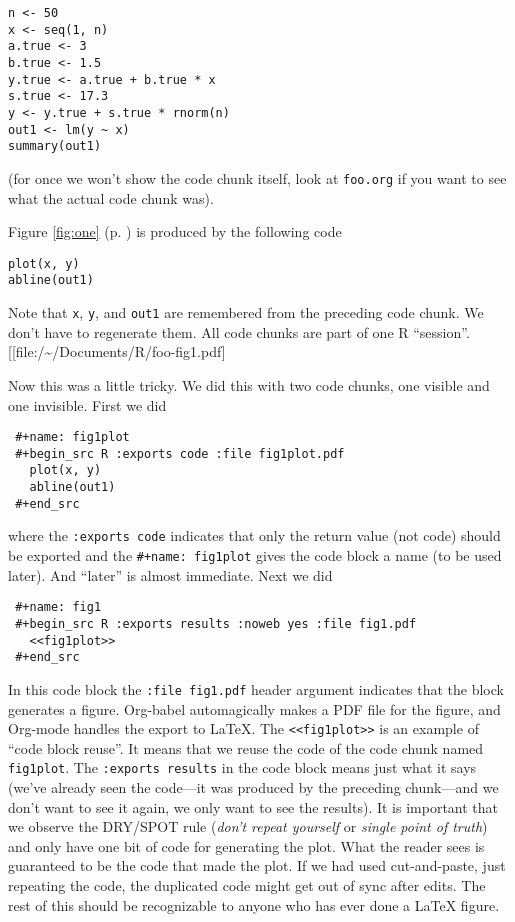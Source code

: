 \documentclass[11pt]{article}
\begin{document}
\begin{verbatim}
n <- 50
x <- seq(1, n)
a.true <- 3
b.true <- 1.5
y.true <- a.true + b.true * x
s.true <- 17.3
y <- y.true + s.true * rnorm(n)
out1 <- lm(y ~ x)
summary(out1)
\end{verbatim}

(for once we won't show the code chunk itself, look at \texttt{foo.org} if
you want to see what the actual code chunk was).

Figure \ref{fig:one} (p. \pageref{fig:one}) is produced by the following code

\begin{verbatim}
plot(x, y)
abline(out1)
\end{verbatim}



Note that \texttt{x}, \texttt{y}, and \texttt{out1} are remembered from the preceding code
chunk.  We don't have to regenerate them.  All code chunks are part of
one R ``session''.
[[file:/\~{}/Documents/R/foo-fig1.pdf]

Now this was a little tricky.  We did this with two code chunks,
one visible and one invisible.  First we did
\begin{verbatim}
 #+name: fig1plot
 #+begin_src R :exports code :file fig1plot.pdf
   plot(x, y)
   abline(out1)
 #+end_src
\end{verbatim}
where the \texttt{:exports code} indicates that only the return value (not
code) should be exported and the \texttt{\#+name: fig1plot} gives the code
block a name (to be used later).  And ``later'' is almost immediate.
Next we did
\begin{verbatim}
 #+name: fig1
 #+begin_src R :exports results :noweb yes :file fig1.pdf
   <<fig1plot>>
 #+end_src
\end{verbatim}

In this code block the \texttt{:file fig1.pdf} header argument indicates that
the block generates a figure.  Org-babel automagically makes a PDF
file for the figure, and Org-mode handles the export to \LaTeX{}.  The
\texttt{<<fig1plot>>} is an example of ``code block reuse''.  It means that we
reuse the code of the code chunk named \texttt{fig1plot}.  The \texttt{:exports results} in the code block means just what it says (we've already seen
the code---it was produced by the preceding chunk---and we don't want
to see it again, we only want to see the results).  It is important
that we observe the DRY/SPOT rule (\emph{don't repeat yourself} or \emph{single point of truth}) and only have one bit of code for generating the
plot.  What the reader sees is guaranteed to be the code that made the
plot.  If we had used cut-and-paste, just repeating the code, the
duplicated code might get out of sync after edits.  The rest of this
should be recognizable to anyone who has ever done a \LaTeX{} figure.
\end{document}
